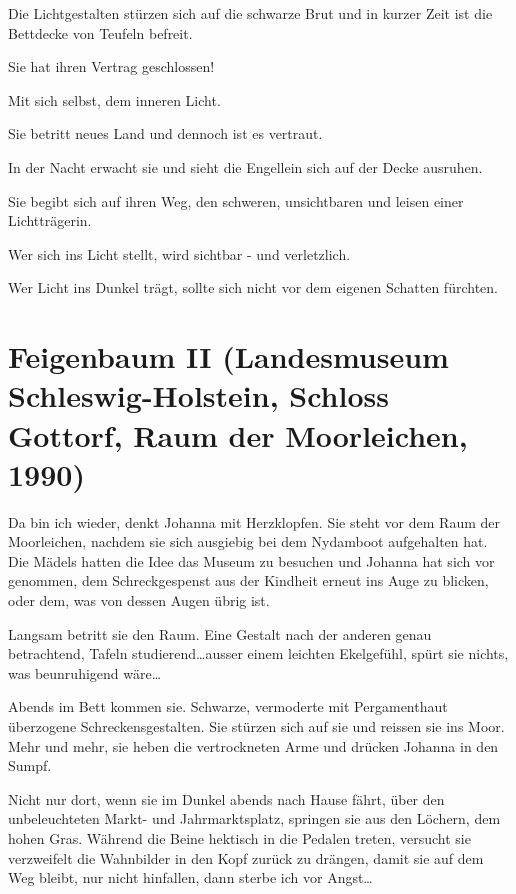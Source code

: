 \documentclass[10pt,a5paper]{book}
\begin{document}
Die Lichtgestalten stürzen sich auf die schwarze Brut und in kurzer Zeit ist die Bettdecke von Teufeln befreit.

Sie hat ihren Vertrag geschlossen!

Mit sich selbst, dem inneren Licht.

Sie betritt neues  Land und dennoch ist es vertraut.

In der Nacht erwacht sie und sieht die Engellein sich auf der Decke ausruhen.

Sie begibt sich auf ihren Weg, den schweren, unsichtbaren und leisen einer Lichtträgerin.

Wer sich ins Licht stellt, wird sichtbar - und verletzlich.

Wer Licht ins Dunkel trägt, sollte sich nicht vor dem eigenen Schatten fürchten.



\section*{Feigenbaum II (Landesmuseum Schleswig-Holstein, Schloss Gottorf, Raum der Moorleichen, 1990)}



Da bin ich wieder, denkt Johanna mit Herzklopfen. Sie steht vor dem Raum der Moorleichen, nachdem sie sich ausgiebig bei dem Nydamboot aufgehalten hat. Die Mädels hatten die Idee das Museum zu besuchen und Johanna hat sich vor genommen, dem Schreckgespenst aus der Kindheit erneut ins Auge zu blicken, oder dem, was von dessen Augen übrig ist.

Langsam betritt sie den Raum. Eine Gestalt nach der anderen genau betrachtend, Tafeln studierend\dots  ausser einem leichten Ekelgefühl, spürt sie nichts, was beunruhigend wäre\dots 

Abends im Bett kommen sie. Schwarze, vermoderte mit Pergamenthaut überzogene Schreckensgestalten. Sie stürzen sich auf sie und reissen sie ins Moor. Mehr und mehr, sie heben die vertrockneten Arme und drücken Johanna in den Sumpf.
 
Nicht nur dort, wenn sie im Dunkel abends nach Hause fährt, über den unbeleuchteten Markt- und Jahrmarktsplatz, springen sie aus den Löchern, dem hohen Gras. Während die Beine hektisch in die Pedalen treten, versucht sie verzweifelt die Wahnbilder in den Kopf zurück zu drängen, damit sie auf dem Weg bleibt, nur nicht hinfallen, dann sterbe ich vor Angst\dots 
\end{document}
